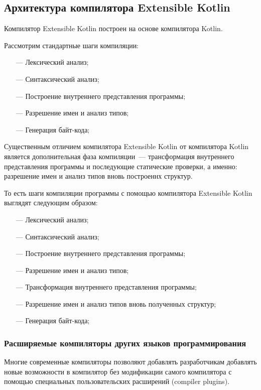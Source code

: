 \subsection{Архитектура компилятора Extensible Kotlin}\label{architecture}
Компилятор Extensible Kotlin построен на основе компилятора Kotlin.

Рассмотрим стандартные шаги компиляции:
\begin{itemize}
\item[---] Лексический анализ;
\item[---] Синтаксический анализ;
\item[---] Построение внутреннего представления программы;
\item[---] Разрешение имен и анализ типов;
\item[---] Генерация байт-кода;
\end{itemize}

Существенным отличием компилятора Extensible Kotlin от компилятора Kotlin является дополнительная фаза компиляции~--- трансформация внутреннего представления программы и последующие статические проверки, а именно: разрешение имен и анализ типов вновь построеннх структур.
\begin{code}
То есть шаги компиляции программы с помощью компилятора Extensible Kotlin выглядят следующим образом:
\begin{itemize}
\item[---] Лексический анализ;
\item[---] Синтаксический анализ;
\item[---] Построение внутреннего представления программы;
\item[---] Разрешение имен и анализ типов;
\item[---] Трансформация внутреннего представления программы;
\item[---] Разрешение имен и анализ типов вновь полученных структур;
\item[---] Генерация байт-кода;
\end{itemize}
\end{code}

\subsubsection{Расширяемые компиляторы других языков программирования}
Многие современные компиляторы позволяют добавлять разработчикам добавлять новые возможности в компилятор без модификации самого компилятора с помощью специальных пользовательских расширений (compiler plugins).

